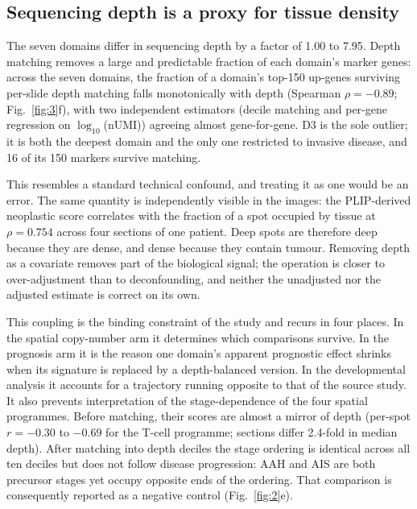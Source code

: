 



\subsection{Sequencing depth is a proxy for tissue density}

The seven domains differ in sequencing depth by a factor of 1.00 to 7.95. Depth matching
removes a large and predictable fraction of each domain's marker genes: across the seven
domains, the fraction of a domain's top-150 up-genes surviving per-slide depth matching
falls monotonically with depth (Spearman $\rho=-0.89$; Fig.~\ref{fig:3}f), with two
independent estimators (decile matching and per-gene regression on $\log_{10}$(nUMI))
agreeing almost gene-for-gene. D3 is the sole outlier; it is both the deepest domain and the
only one restricted to invasive disease, and 16 of its 150 markers survive matching.

This resembles a standard technical confound, and treating it as one would be an error. The
same quantity is independently visible in the images: the PLIP-derived neoplastic score
correlates with the fraction of a spot occupied by tissue at $\rho=0.754$ across four
sections of one patient. Deep spots are therefore deep because they are dense, and dense
because they contain tumour. Removing depth as a covariate removes part of the biological
signal; the operation is closer to over-adjustment than to deconfounding, and neither the
unadjusted nor the adjusted estimate is correct on its own.

This coupling is the binding constraint of the study and recurs in four places. In the
spatial copy-number arm it determines which comparisons survive. In the prognosis arm it is
the reason one domain's apparent prognostic effect shrinks when its signature is replaced by
a depth-balanced version. In the developmental analysis it accounts for a trajectory running
opposite to that of the source study. It also prevents interpretation of the
stage-dependence of the four spatial programmes. Before matching, their scores are almost a
mirror of depth (per-spot $r=-0.30$ to $-0.69$ for the T-cell programme; sections differ
2.4-fold in median depth). After matching into depth deciles the stage ordering is identical
across all ten deciles but does not follow disease progression: AAH and AIS are both
precursor stages yet occupy opposite ends of the ordering. That comparison is consequently
reported as a negative control (Fig.~\ref{fig:2}e).

